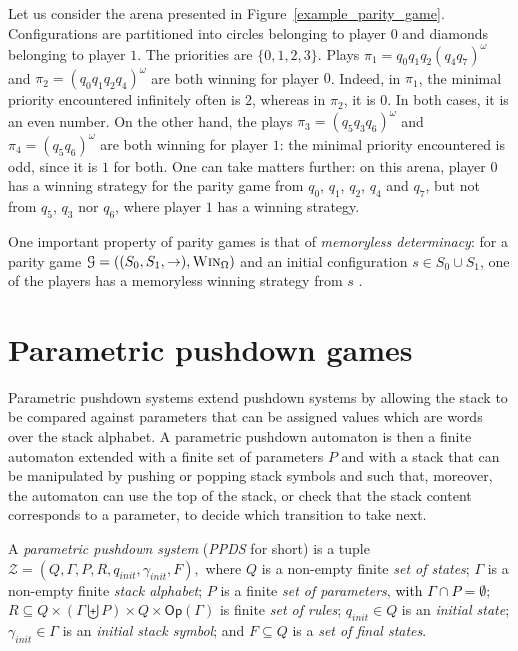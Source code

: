 \documentclass[a4paper,UKenglish,cleveref, autoref, thm-restate]{lipics-v2021}
\newcommand{\Op}{\mathsf{Op}}
\newcommand{\win}{\textsc{Win}}
\begin{document}
\begin{example}
Let us consider the arena presented in  Figure~\ref{example_parity_game}. 
Configurations are partitioned into circles belonging to player $0$ and diamonds
belonging to player $1$. 
The priorities are $\{ 0,1,2,3\}$.
Plays $\pi_1 = q_0 q_1 q_2 (q_4 q_7)^\omega$ and 
$\pi_2 = (q_0 q_1 q_2 q_4)^\omega$ are both winning for player $0$. Indeed, in $\pi_1$, 
the minimal priority encountered infinitely often is   
				$2$, 
whereas in $\pi_2$, it is   
			$0$. 
In both cases, it is an even number. On the other hand,
the plays $\pi_3 = (q_5 q_3 q_6)^\omega$ and $\pi_4=(q_5 q_6)^\omega$ are both winning for player $1$: the minimal priority encountered is odd, since it is $1$ for both.
One can take matters further: on this arena, player $0$ has a winning strategy for the parity game from $q_0$, $q_1$, $q_2$, $q_4$ and $q_7$, but not from $q_5$, $q_3$ nor $q_6$, where player $1$ has a winning strategy. 
\end{example}



One important property of parity games is that of {\em memoryless determinacy}: for a parity game
$\mathcal{G}= ((S_0,S_1,\rightarrow),\win_\Omega) $ and an initial configuration $s \in S_0 \cup S_1$, one of the players has a memoryless winning strategy from $s$ \cite{zielonka1998infinite}.



\section{Parametric pushdown games}



Parametric pushdown systems extend pushdown systems by allowing the stack to be compared against parameters that can be assigned values which are words over the stack alphabet.
A parametric pushdown automaton is then a finite automaton extended with a finite set of parameters $P$  and with a stack that can be manipulated by pushing or popping stack symbols and such that, moreover, the automaton can use the top of the stack, or check that the stack content corresponds to a parameter,  to decide which transition to take next.\\

\par\noindent\ignorespacesafterend
A {\em parametric pushdown system} ({\em PPDS} for short) 
is a tuple $\mathcal{Z} = (Q, \Gamma, P, R, q_{init},\gamma_{init}, F),$ where
 $Q$ is a non-empty finite {\em set of  states};
 $\Gamma$ is a non-empty finite {\em  stack alphabet};
 $P$ is a finite {\em   set of parameters}, \textcolor{black}{with $\Gamma \cap P = \emptyset$};
  $R   \subseteq  Q  \times (\Gamma \biguplus P)  \times Q  \times \Op(\Gamma)$ is finite {\em  set of rules};
 $q_{init}\in Q$ is an {\em initial  state};
 $ \gamma_{init} \in \Gamma$ is an {\em initial stack symbol}; and
 $F\subseteq Q$ is a {\em set of final  states}.
\end{document}
